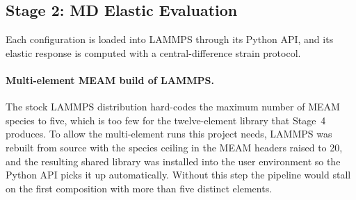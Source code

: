 \subsection{Stage 2: MD Elastic Evaluation}
\label{sec:stage2}

Each configuration is loaded into LAMMPS \citep{thompson2022} through its
Python API, and its elastic response is computed with a central-difference
strain protocol.

\paragraph{Multi-element MEAM build of LAMMPS.}
The stock LAMMPS distribution hard-codes the maximum number of MEAM species to
five, which is too few for the twelve-element library that Stage~4 produces. To
allow the multi-element runs this project needs, LAMMPS was rebuilt from source
with the species ceiling in the MEAM headers raised to 20, and the resulting
shared library was installed into the user environment so the Python API picks
it up automatically. Without this step the pipeline would stall on the first
composition with more than five distinct elements.

